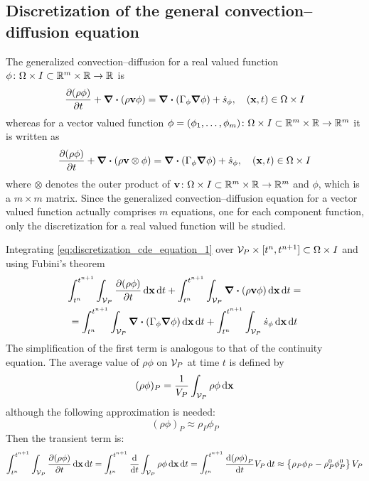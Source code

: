 
\subsection{Discretization of the general convection--diffusion equation}

The generalized convection--diffusion for a real valued function $\phi \colon \Omega \times I \subset \mathbb{R}^m \times \mathbb{R} \rightarrow \mathbb{R}$ is
\begin{equation} \label{eq:discretization_cde_equation_1}
	\pdv{(\rho \phi)}{t} + \div(\rho \vb{v} \phi) = 
	\div(\Gamma_\phi \grad{\phi}) + \dot{s}_\phi,
	\quad (\vb{x}, t) \in \Omega \times I
\end{equation}
whereas for a vector valued function $\phi = (\phi_1, \ldots, \phi_m) \colon \Omega \times I \subset \mathbb{R}^m \times \mathbb{R} \rightarrow \mathbb{R}^m$ it is written as
\begin{equation}
	\pdv{(\rho \phi)}{t} + \div(\rho \vb{v} \otimes \phi) = 
	\div(\Gamma_\phi \grad{\phi}) + \dot{s}_\phi,
	\quad (\vb{x}, t) \in \Omega \times I
\end{equation}
where $\otimes$ denotes the outer product of $\vb{v} \colon \Omega \times I \subset \mathbb{R}^m \times \mathbb{R} \rightarrow \mathbb{R}^m$ and $\phi$, which is a $m \times m$ matrix. Since the generalized convection--diffusion equation for a vector valued function actually comprises $m$ equations, one for each component function, only the discretization for a real valued function will be studied. 

Integrating \eqref{eq:discretization_cde_equation_1} over $\mathcal{V}_{P} \times [t^n, t^{n+1}] \subset \Omega \times I$ and using Fubini's theorem
\begin{multline}
	\int_{t^n}^{t^{n+1}} \int_{\mathcal{V}_{P}} \pdv{(\rho \phi)}{t} \dd{\vb{x}} \dd{t} + 
	\int_{t^n}^{t^{n+1}} \int_{\mathcal{V}_{P}} \div(\rho \vb{v} \phi) \dd{\vb{x}} \dd{t} = \\ = 
	\int_{t^n}^{t^{n+1}} \int_{\mathcal{V}_{P}} \div(\Gamma_\phi \grad{\phi}) \dd{\vb{x}} \dd{t} +
	\int_{t^n}^{t^{n+1}} \int_{\mathcal{V}_{P}} \dot{s}_\phi \dd{\vb{x}} \dd{t}	
\end{multline}
The simplification of the first term is analogous to that of the continuity equation. The average value of $\rho \phi$ on $\mathcal{V}_{P}$ at time $t$ is defined by
\begin{equation}
	(\rho \phi)_P = \frac{1}{V_P} \int_{\mathcal{V}_{P}} \rho \phi \dd{\vb{x}}
\end{equation}
although the following approximation is needed:
\begin{equation}
	(\rho \phi)_P \approx \rho_P \phi_P
\end{equation}
Then the transient term is:
\begin{equation}
	\int_{t^n}^{t^{n+1}} \int_{\mathcal{V}_{P}} \pdv{(\rho \phi)}{t} \dd{\vb{x}} \dd{t} = 
	\int_{t^n}^{t^{n+1}} \frac{\dd}{\dd{t}} \int_{\mathcal{V}_{P}} \rho \phi \dd{\vb{x}} \dd{t} =  
	\int_{t^n}^{t^{n+1}} \frac{\dd(\rho \phi)_P}{\dd{t}} V_P \dd{t} \approx 
	\left\{ \rho_P \phi_P - \rho_P^0 \phi_P^0 \right\} V_P
\end{equation}

